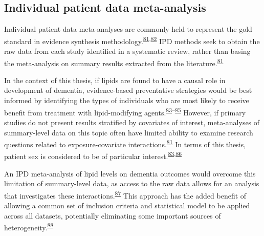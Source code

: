 \documentclass[a4paper, twoside]{templates/ociamthesis}
\begin{document}
\hypertarget{individual-patient-data-meta-analysis}{%
\subsection{Individual patient data meta-analysis}\label{individual-patient-data-meta-analysis}}

Individual patient data meta-analyses are commonly held to represent the gold standard in evidence synthesis methodology.\textsuperscript{\protect\hyperlink{ref-riley2010}{81},\protect\hyperlink{ref-stewart1993}{82}} IPD methods seek to obtain the raw data from each study identified in a systematic review, rather than basing the meta-analysis on summary results extracted from the literature.\textsuperscript{\protect\hyperlink{ref-riley2010}{81}}

In the context of this thesis, if lipids are found to have a causal role in development of dementia, evidence-based preventative strategies would be best informed by identifying the types of individuals who are most likely to receive benefit from treatment with lipid-modifying agents.\textsuperscript{\protect\hyperlink{ref-arain2009}{83}--\protect\hyperlink{ref-mccartney2016}{85}} However, if primary studies do not present results stratified by covariates of interest, meta-analyses of summary-level data on this topic often have limited ability to examine research questions related to exposure-covariate interactions.\textsuperscript{\protect\hyperlink{ref-riley2010}{81}} In terms of this thesis, patient sex is considered to be of particular interest.\textsuperscript{\protect\hyperlink{ref-arain2009}{83},\protect\hyperlink{ref-letenneur1999}{86}}

An IPD meta-analysis of lipid levels on dementia outcomes would overcome this limitation of summary-level data, as access to the raw data allows for an analysis that investigates these interactions.\textsuperscript{\protect\hyperlink{ref-riley2020}{87}} This approach has the added benefit of allowing a common set of inclusion criteria and statistical model to be applied across all datasets, potentially eliminating some important sources of heterogeneity.\textsuperscript{\protect\hyperlink{ref-stewart2002}{88}}
\end{document}
